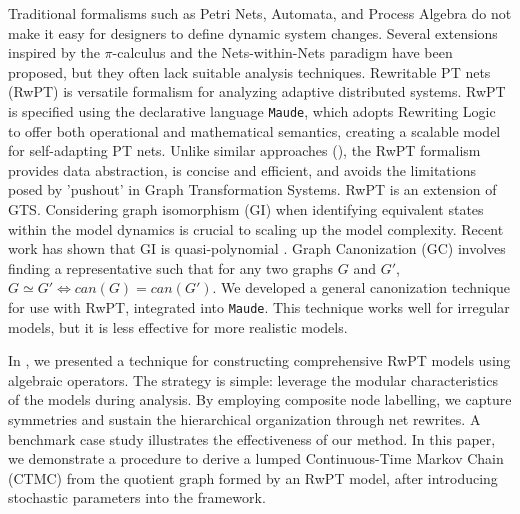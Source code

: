 Traditional formalisms such as Petri Nets, Automata, and Process Algebra do not make it easy for designers to define dynamic system changes. Several extensions inspired by the $\pi$-calculus and the Nets-within-Nets paradigm have been proposed, but they often lack suitable analysis techniques. Rewritable PT nets (RwPT) \cite{lcICDCIT22} is versatile formalism for analyzing adaptive distributed systems. RwPT is specified using the declarative language \texttt{Maude}, which adopts Rewriting Logic to offer both operational and mathematical semantics, creating a scalable model for self-adapting PT nets.
Unlike similar approaches (\cite{Barbosa11,RPN-Maude2016}),
the RwPT formalism provides data abstraction, is concise and efficient, and avoids the limitations posed by 'pushout' in Graph Transformation Systems. RwPT is an extension of GTS. Considering graph isomorphism (GI) when identifying equivalent states within the model dynamics is crucial to scaling up the model complexity.
Recent work has shown that GI is quasi-polynomial \cite{GIBabai}.
Graph Canonization (GC) involves finding a representative such that for any two graphs $G$ and $G'$, $G \simeq G' \Leftrightarrow can(G) = can(G')$. We developed a general canonization technique \cite{Capra:RP22} for use with RwPT, integrated into \texttt{Maude}. This technique works well for irregular models, but it is less effective for more realistic models.

In \cite{CAPRA-TCS2024}, we presented a technique for constructing comprehensive RwPT models using algebraic operators. The strategy is simple: leverage the modular characteristics of the models during analysis. By employing composite node labelling, we capture symmetries and sustain the hierarchical organization through net rewrites. A benchmark case study illustrates the effectiveness of our method.
In this paper, we demonstrate a procedure to derive a lumped Continuous-Time Markov Chain (CTMC) from the quotient graph formed by an RwPT model, after introducing stochastic parameters into the framework.

